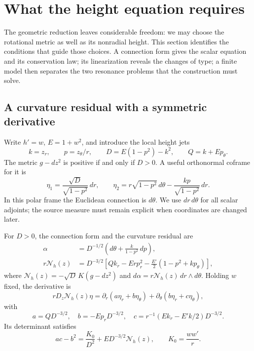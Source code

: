 \section{What the height equation requires}
\label{sec:scalar-core}

The geometric reduction leaves considerable freedom: we may choose
the rotational metric as well as its nonradial height. This section
identifies the conditions that guide those choices. A connection
form gives the scalar equation and its conservation law; its
linearization reveals the changes of type; a finite model then
separates the two resonance problems that the construction must solve.

\subsection{A curvature residual with a symmetric derivative}

Write $h'=w$, $E=1+w^2$, and introduce the local height jets
\begin{equation}\label{eq:height-jet-notation}
 k=z_r,\qquad p=z_\theta/r,\qquad
 D=E(1-p^2)-k^2,\qquad Q=k+Ep_\theta.
\end{equation}
The metric $g-dz^2$ is positive if and only if $D>0$. A useful
orthonormal coframe for it is
\[
 \eta_1=\frac{\sqrt D}{\sqrt{1-p^2}}\,dr,\qquad
 \eta_2=r\sqrt{1-p^2}\,d\theta-
             \frac{kp}{\sqrt{1-p^2}}\,dr.
\]
In this polar frame the Euclidean connection is $d\theta$.
We use $dr\,d\theta$ for all scalar adjoints; the source measure
must remain explicit when coordinates are changed later.

\begin{proposition}\label{prop:scalar-core}
For $D>0$, the connection form and the curvature residual are
\begin{align}
 \alpha&=D^{-1/2}\left(d\theta+\frac{k}{1-p^2}\,dp\right),
       \label{eq:conn-one-form}\\
 r\mathcal N_h(z)&=D^{-3/2}
 \left[Qk_r-Erp_r^2-\frac{E'}2(1-p^2+kp_\theta)\right],
       \label{eq:cart-curvature-scalar}
\end{align}
where $\mathcal N_h(z)=-\sqrt D\,K(g-dz^2)$ and
$d\alpha=r\mathcal N_h(z)\,dr\wedge d\theta$.
Holding $w$ fixed, the derivative is
\begin{equation}\label{eq:cart-true-derivative}
 rD_z\mathcal N_h(z)\eta
  =\partial_r(a\eta_r+b\eta_\theta)
       +\partial_\theta(b\eta_r+c\eta_\theta),
\end{equation}
with
\begin{equation}\label{eq:linear-coefficients}
 a=QD^{-3/2},\quad b=-Ep_rD^{-3/2},\quad
 c=r^{-1}(Ek_r-E'k/2)D^{-3/2}.
\end{equation}
Its determinant satisfies
\begin{equation}\label{eq:cart-determinant-identity}
 ac-b^2=\frac{K_0}{D^2}+ED^{-3/2}\mathcal N_h(z),
 \qquad K_0=\frac{ww'}r.
\end{equation}
\end{proposition}

